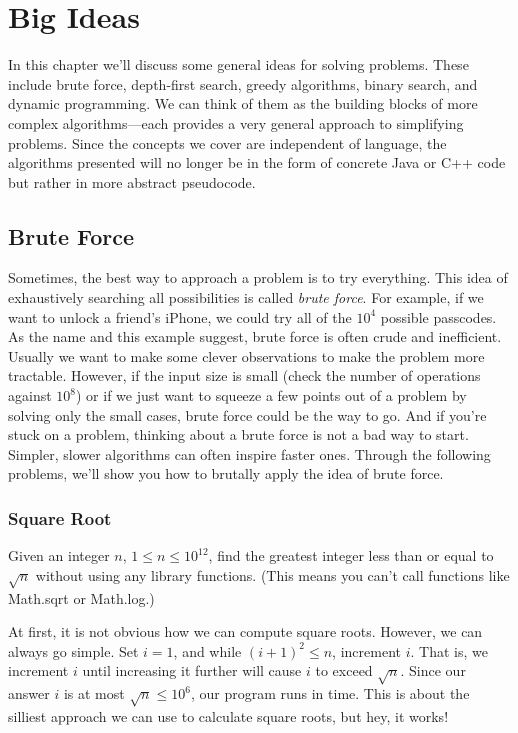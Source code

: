 \chapter{Big Ideas}

In this chapter we'll discuss some general ideas for solving problems. These include brute force,  depth-first search, greedy algorithms, binary search, and dynamic programming. We can think of them as the building blocks of more complex algorithms---each provides a very general approach to simplifying problems. Since the concepts we cover are independent of language, the algorithms presented will no longer be in the form of concrete Java or C++ code but rather in more abstract pseudocode.

\section{Brute Force}

Sometimes, the best way to approach a problem is to try everything. This idea of exhaustively searching all possibilities is called \emph{brute force}. For example, if we want to unlock a friend's iPhone, we could try all of the $10^4$ possible passcodes. As the name and this example suggest, brute force is often crude and inefficient. Usually we want to make some clever observations to make the problem more tractable. However, if the input size is small (check the number of operations against $10^8$) or if we just want to squeeze a few points out of a problem by solving only the small cases, brute force could be the way to go. And if you're stuck on a problem, thinking about a brute force is not a bad way to start. Simpler, slower algorithms can often inspire faster ones. Through the following problems, we'll show you how to brutally apply the idea of brute force.

\subsection{Square Root}

\begin{typewriter}
  Given an integer $n$, $1 \le n \le 10^{12}$, find the greatest integer less than or equal to $\sqrt{n}$ without using any library functions. (This means you can't call functions like Math.sqrt or Math.log.)
\end{typewriter}

At first, it is not obvious how we can compute square roots. However, we can always go simple. Set $i = 1$, and while $(i+1)^2\le n$, increment $i$. That is, we increment $i$ until increasing it further will cause $i$ to exceed $\sqrt n$. Since our answer $i$ is at most $\sqrt n \le 10^6$, our program runs in time. This is about the silliest approach we can use to calculate square roots, but hey, it works!

